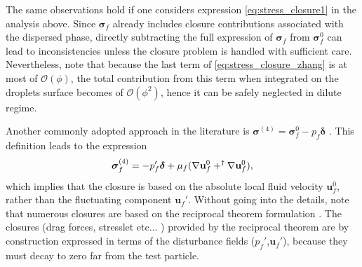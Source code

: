 The same observations hold if one considers expression \ref{eq:stress_closure1} in the analysis above. 
Since $\bm\sigma_f$ already includes closure contributions associated with the dispersed phase, directly subtracting the full expression of $\bm\sigma_f$ from $\bm\sigma_f^0$ can lead to inconsistencies unless the closure problem is handled with sufficient care.%
Nevertheless, note that because the last term of \ref{eq:stress_closure_zhang} is at most of $\mathcal{O}(\phi)$, the total contribution from this term when integrated on the droplets surface becomes of $\mathcal{O}(\phi^2)$, hence it can be safely neglected in dilute regime. 

Another commonly adopted approach in the literature is $\bm \sigma ^{(4)} = \bm \sigma _f ^0 - p_f\bm\delta$ \citep{simonin1996,lhuillier2009rheology,morel2015mathematical,guazzelli2018rheology}.
This definition leads to the expression
\begin{equation}
    \bm\sigma_f^{(4)}  = -p_f' \bm\delta + \mu_f (\mathbf{\nabla} \textbf{u}_f^0 + ^\dagger \mathbf{\nabla} \textbf{u}_f^0),
\end{equation}
which implies that the closure is based on the absolute local fluid velocity $\textbf{u}_f^0$, rather than the fluctuating component $\textbf{u}_f'$.
Without going into the details, note that numerous closures are based on the reciprocal theorem formulation \citep{kim2013microhydrodynamics,stone2001inertial,raja2010inertial}.%
The closures (drag forces, stresslet etc... ) provided by the reciprocal theorem are by construction expressed in terms of the disturbance fields ($p_f'$,$\textbf{u}_f'$), because they must decay to zero far from the test particle. 

